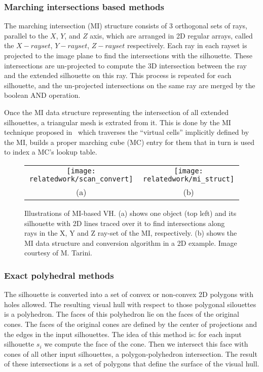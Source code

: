 \subsubsection{Marching intersections based methods}
The marching intersection (MI) structure consists of 3 orthogonal sets of rays, parallel to the $X$, $Y$, and $Z$ axis, which are arranged in 2D regular arrays, called the $X-rayset$, $Y-rayset$, $Z-rayset$ respectively. Each ray in each rayset is projected to the image plane to find the intersections with the silhouette. These intersections are un-projected to compute the 3D intersection between the ray and the extended silhouette on this ray. This process is repeated for each silhouette, and the un-projected intersections on the same ray are merged by the boolean AND operation.

Once the MI data structure representing the intersection of all extended silhouettes, a triangular mesh is extrated from it. This is done by the MI technique proposed in~\cite{rocchini2001marching} which traverses the ``virtual cells'' implicitly defined by the MI, builds a proper marching cube (MC) entry for them that in turn is used to index a MC's lookup table.
\begin{figure}[h]
\centering
\begin{tabular}{cc}
\texttt{[image: relatedwork/scan\_convert]}&
\texttt{[image: relatedwork/mi\_struct]}\\
(a) & (b)\\
\end{tabular}
\caption{Illustrations of MI-based VH. (a) shows one object (top left) and its silhouette with 2D lines traced over it to find intersections along rays in the X, Y and Z ray-set of the MI, respectively. (b) shows the MI data structure and conversion algorithm in a 2D example. Image courtesy of M. Tarini.}
\label{fig:robust_pc}
\end{figure}

\subsubsection{Exact polyhedral methods}
The silhouette is converted into a set of convex or non-convex 2D polygons with holes allowed. The resulting visual hull with respect to those polygonal silouettes is a polyhedron. The faces of this polyhedron lie on the faces of the original cones. The faces of the original cones are defined by the center of projections and the edges in the input silhouettes. The idea of this method is: for each input silhouette $s_i$ we compute the face of the cone. Then we intersect this face with cones of all other input silhouettes, \ie a polygon-polyhedron intersection. The result of these intersections is a set of polygons that define the surface of the visual hull.

